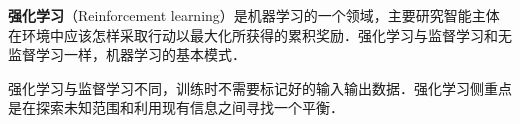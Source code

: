 
\textbf{强化学习}（Reinforcement learning）是机器学习的一个领域，主要研究智能主体在环境中应该怎样采取行动以最大化所获得的累积奖励．强化学习与监督学习和无监督学习一样，机器学习的基本模式．

强化学习与监督学习不同，训练时不需要标记好的输入输出数据．强化学习侧重点是在探索未知范围和利用现有信息之间寻找一个平衡．